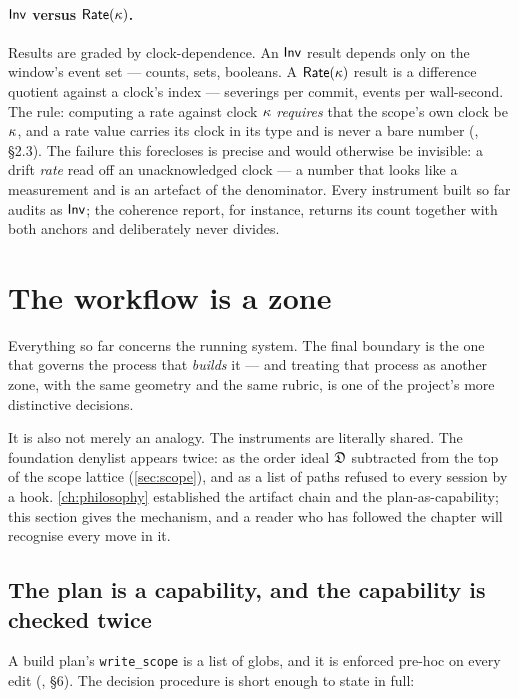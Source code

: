 \paragraph{$\textsf{Inv}{}$ versus $\textsf{Rate}{}(\kappa{})$.} Results are graded by
clock-dependence. An $\textsf{Inv}{}$ result depends only on the window's event set ---
counts, sets, booleans. A $\textsf{Rate}{}(\kappa{})$ result is a difference quotient
against a clock's index --- severings per commit, events per wall-second. The rule:
computing a rate against clock $\kappa{}$ \emph{requires} that the scope's own
clock be $\kappa{}$, and a rate value carries its clock in its type and is never a
bare number (, \S 2.3). The failure this forecloses
is precise and would otherwise be invisible: a drift \emph{rate} read off an
unacknowledged clock --- a number that looks like a measurement and is an artefact
of the denominator. Every instrument built so far audits as $\textsf{Inv}{}$; the coherence
report, for instance, returns its count together with both anchors and deliberately
never divides.

\section{The workflow is a zone}
\label{sec:workflow}

Everything so far concerns the running system. The final boundary is the one that
governs the process that \emph{builds} it --- and treating that process as another
zone, with the same geometry and the same rubric, is one of the project's more
distinctive decisions.

It is also not merely an analogy. The instruments are literally shared. The
foundation denylist appears twice: as the order ideal $\mathfrak{D}{}$ subtracted from
the top of the scope lattice (\autoref{sec:scope}), and as a list of paths refused
to every session by a hook. \autoref{ch:philosophy} established the artifact chain
and the plan-as-capability; this section gives the mechanism, and a reader who has
followed the chapter will recognise every move in it.

\subsection*{The plan is a capability, and the capability is checked twice}

A build plan's \texttt{write\_scope} is a list of globs, and it is enforced pre-hoc
on every edit (, \S 6). The decision procedure is short
enough to state in full:

